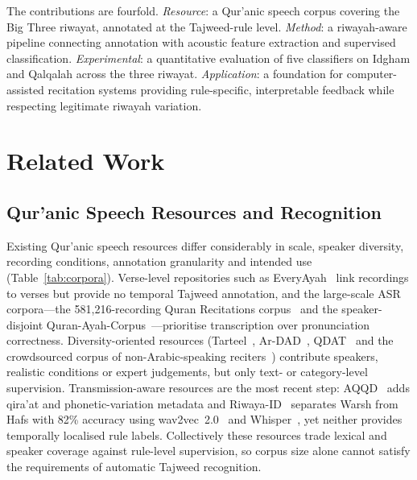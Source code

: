 \documentclass[runningheads]{llncs}
\begin{document}
The contributions are fourfold. \emph{Resource}: a Qur'anic speech corpus
covering the Big Three riwayat, annotated at the Tajweed-rule level.
\emph{Method}: a riwayah-aware pipeline connecting annotation with acoustic
feature extraction and supervised classification. \emph{Experimental}: a
quantitative evaluation of five classifiers on Idgham and Qalqalah across the
three riwayat. \emph{Application}: a foundation for computer-assisted
recitation systems providing rule-specific, interpretable feedback while
respecting legitimate riwayah variation.


\section{Related Work}
\label{sec:related}

\subsection{Qur'anic Speech Resources and Recognition}

Existing Qur'anic speech resources differ considerably in scale, speaker
diversity, recording conditions, annotation granularity and intended use
(Table~\ref{tab:corpora}). Verse-level repositories such as
EveryAyah~\cite{everyayah} link recordings to verses but provide no temporal
Tajweed annotation, and the large-scale ASR corpora---the 581{,}216-recording
Quran Recitations corpus~\cite{quran_recitations_asr} and the speaker-disjoint
Quran-Ayah-Corpus~\cite{quran_ayah_corpus}---prioritise transcription over
pronunciation correctness. Diversity-oriented resources
(Tarteel~\cite{khan2023tarteel}, Ar-DAD~\cite{ardad}, QDAT~\cite{qdat} and the
crowdsourced corpus of non-Arabic-speaking reciters~\cite{quranic_audio_crowd})
contribute speakers, realistic conditions or expert judgements, but only text-
or category-level supervision. Transmission-aware resources are the most recent
step: AQQD~\cite{smail2024aqqd} adds qira'at and phonetic-variation metadata and
Riwaya-ID~\cite{riwaya_id} separates Warsh from Hafs with 82\% accuracy using
wav2vec~2.0~\cite{baevski2020wav2vec} and Whisper~\cite{radford2023whisper}, yet
neither provides temporally localised rule labels. Collectively these resources
trade lexical and speaker coverage against rule-level supervision, so corpus
size alone cannot satisfy the requirements of automatic Tajweed recognition.
\end{document}
